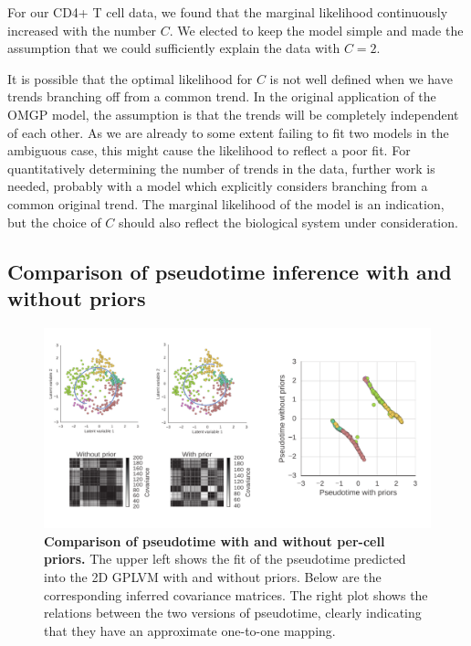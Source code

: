 For our CD4+ T cell data, we found that the marginal likelihood continuously increased with the number $ C $. We elected to keep the model simple and made the assumption that we could sufficiently explain the data with $ C = 2. $

It is possible that the optimal likelihood for \( C \) is not well defined when we have trends branching off from a common trend. In the original application of the OMGP model, the assumption is that the trends will be completely independent of each other. As we are already to some extent failing to fit two models in the ambiguous case, this might cause the likelihood to reflect a poor fit. For quantitatively determining the number of trends in the data, further work is needed, probably with a model which explicitly considers branching from a common original trend. The marginal likelihood of the model is an indication, but the choice of $ C $ should also reflect the biological system under consideration.

\subsection{Comparison of pseudotime inference with and without priors}

\begin{figure}
    \centering
    \includegraphics[width=\textwidth]{"fig-priors"}
    \caption[Comparison of pseudotime with and without per-cell priors]{\textbf{Comparison of pseudotime with and without per-cell priors.} The upper left shows the fit of the pseudotime predicted into the 2D GPLVM with and without priors. Below are the corresponding inferred covariance matrices. The right plot shows the relations between the two versions of pseudotime, clearly indicating that they have an approximate one-to-one mapping.}
    \label{fig:priors}
\end{figure}

